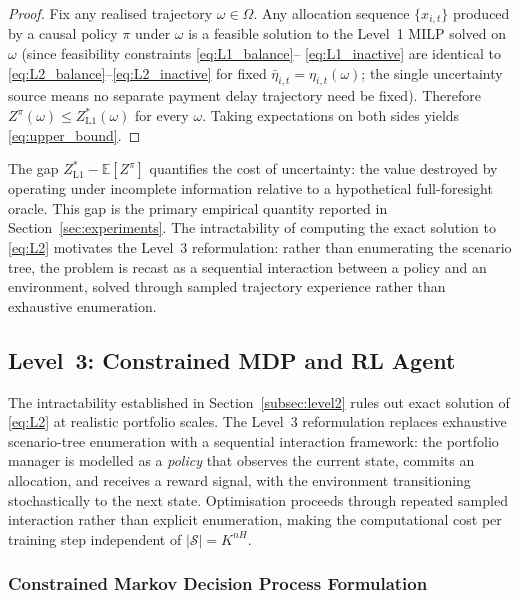 \begin{proof}
Fix any realised trajectory $\omega \in \Omega$. Any allocation
sequence $\{x_{i,t}\}$ produced by a causal policy $\pi$ under
$\omega$ is a feasible solution to the Level~1 MILP solved on
$\omega$ (since feasibility constraints \eqref{eq:L1_balance}--
\eqref{eq:L1_inactive} are identical to
\eqref{eq:L2_balance}--\eqref{eq:L2_inactive} for fixed
$\bar{\eta}_{i,t} = \eta_{i,t}(\omega)$; the single uncertainty
source means no separate payment delay trajectory need be fixed).
Therefore $Z^\pi(\omega) \leq Z^*_{\mathrm{L1}}(\omega)$ for
every $\omega$. Taking expectations on both sides yields
\eqref{eq:upper_bound}.
\end{proof}

The gap $Z^*_{\mathrm{L1}} - \mathbb{E}[Z^\pi]$ quantifies the cost
of uncertainty: the value destroyed by operating under incomplete
information relative to a hypothetical full-foresight oracle. This gap
is the primary empirical quantity reported in
Section~\ref{sec:experiments}. The intractability of computing the
exact solution to \eqref{eq:L2} motivates the Level~3 reformulation:
rather than enumerating the scenario tree, the problem is recast as a
sequential interaction between a policy and an environment, solved
through sampled trajectory experience rather than exhaustive
enumeration.

\subsection{Level~3: Constrained MDP and RL Agent}
\label{subsec:level3}

The intractability established in Section~\ref{subsec:level2} rules out
exact solution of \eqref{eq:L2} at realistic portfolio scales. The
Level~3 reformulation replaces exhaustive scenario-tree enumeration
with a sequential interaction framework: the portfolio manager is
modelled as a \emph{policy} that observes the current state, commits
an allocation, and receives a reward signal, with the environment
transitioning stochastically to the next state. Optimisation proceeds
through repeated sampled interaction rather than explicit enumeration,
making the computational cost per training step independent of
$|\mathcal{S}| = K^{nH}$.

\subsubsection{Constrained Markov Decision Process Formulation}
\label{subsubsec:l3_cmdp}

